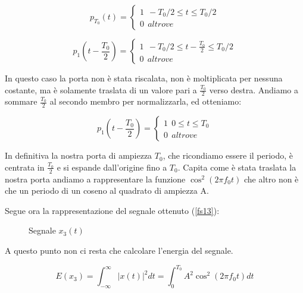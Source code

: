 \documentclass[../main.tex]{subfiles}
\begin{document}
\begin{equation}
	p_{T_0}(t) = \begin{cases}
	1\:\: -{T_0}/2 \leq t \leq {T_0}/2\\
	0\:\: \unit{altrove}	
\end{cases}
\end{equation}

\begin{equation}
	p_1(t - \frac{T_0}{2}) = \begin{cases}
	1\:\: -{T_0}/2 \leq t - \frac{T_0}{2} \leq {T_0}/2\\
	0\:\: \unit{altrove}	
\end{cases}
\end{equation}

In questo caso la porta non è stata riscalata, non è moltiplicata per nessuna costante, ma è solamente traslata di un valore pari a $\frac{T_0}{2}$ verso destra.
Andiamo a sommare $\frac{T_0}{2}$ al secondo membro per normalizzarla, ed otteniamo:

\begin{equation}
	p_1(t - \frac{T_0}{2}) = \begin{cases}
	1\:\: 0 \leq t \leq {T_0}\\
	0\:\: \unit{altrove}	
\end{cases}
\end{equation}


In definitiva la nostra porta di ampiezza $T_0$, che ricondiamo essere il periodo, è centrata in $\frac{T_0}{2}$ e si espande dall'origine fino a $T_0$.
Capita come è stata traslata la nostra porta andiamo a rappresentare la funzione $\cos^2(2\pi f_0 t)$ che altro non è che un periodo di un coseno al quadrato di ampiezza A.

Segue ora la rappresentazione del segnale ottenuto (\autoref{fs13}):

\begin{figure}[h]
\begin{center}


\label{fs13}
\caption{Segnale $x_3(t)$}	
\end{center}	
\end{figure}

A questo punto non ci resta che calcolare l'energia del segnale.

\begin{equation}
	E(x_3) = \int_{-\infty}^{\infty} \big | x(t) \big |^2 dt = \int_{0}^{T_0} A^2 \cos^2(2\pi f_0 t) dt
\end{equation}
\end{document}

